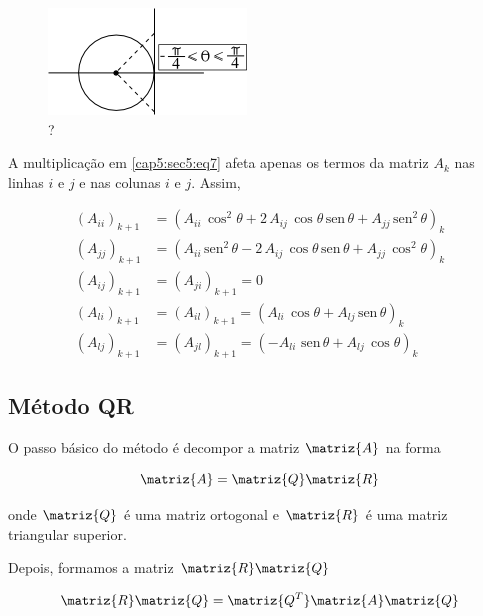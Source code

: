 \begin{figure}[htb]
 \centering
 \includegraphics[scale=1.0]{capitulos/capitulo5/figuras/met_iter_qr1.png}
 \caption{?}
 \label{fig:met_iter_qr1}
\end{figure}

A multiplicação em \ref{cap5:sec5:eq7} afeta apenas os termos da matriz $ A_{k} $ nas linhas $ i $ e $ j $ e nas colunas $ i $ e $ j $. Assim,

\begin{equation}
 \label{cap5:sec5:eq10}
 \begin{array}{cl}
  (A_{ii})_{k+1} & = (A_{ii} \, \cos^2 \theta + 2 \, A_{ij} \, \cos \theta \, \mbox{sen} \, \theta + A_{jj} \, \mbox{sen}^2 \, \theta)_k \\
  (A_{jj})_{k+1} & = (A_{ii} \, \mbox{sen}^2 \, \theta - 2 \, A_{ij} \, \cos \theta \, \mbox{sen} \, \theta + A_{jj} \, \cos^2 \theta)_k \\
  (A_{ij})_{k+1} & = (A_{ji})_{k+1} = 0 \\
  (A_{li})_{k+1} & = (A_{il})_{k+1} = (A_{li} \, \cos \theta + A_{lj} \, \mbox{sen} \, \theta)_k \\
  (A_{lj})_{k+1} & = (A_{jl})_{k+1} = (-A_{li} \, \, \mbox{sen} \, \theta + A_{lj} \, \cos \theta)_k
 \end{array}
\end{equation}

\subsection{Método QR}

O passo básico do método é decompor a matriz $ \matriz{A} $ na forma

\begin{equation}
 \label{cap5:sec5:eq11}
 \matriz{A} = \matriz{Q} \matriz{R}
\end{equation}

\noindent
onde $ \matriz{Q} $ é uma matriz ortogonal e $ \matriz{R} $ é uma matriz triangular superior.

Depois, formamos a matriz $ \matriz{R} \matriz{Q} $

\begin{equation}
 \label{cap5:sec5:eq12}
 \matriz{R} \matriz{Q} = \matriz{Q^T} \matriz{A} \matriz{Q}
\end{equation}

